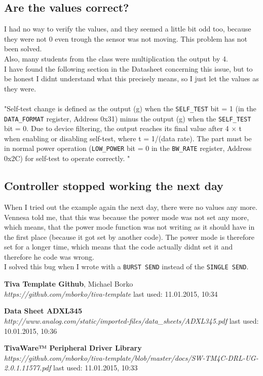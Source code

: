 \documentclass[12pt]{article}
\begin{document}
\subsection{Are the values correct?}
I had no way to verify the values, and they seemed a little bit odd too, because they were not 0 even trough the sensor was not moving. This problem has not been solved. \\
Also, many students from the class were multiplication the output by 4. \\
I have found the following section in the Datasheet concerning this issue, but to be honest I didnt understand what this precisely means, so I just let the values as they were. \\ \\
"Self-test change is defined as the output (g) when the \texttt{SELF\_TEST} bit = 1 (in the \texttt{DATA\_FORMAT} register, Address 0x31) minus the output (g) when the \texttt{SELF\_TEST} bit = 0. Due to device filtering, the output reaches its final value after 4 × t when enabling or disabling self-test, where t = 1/(data rate). The part must be in normal power operation (\texttt{LOW\_POWER} bit = 0 in the \texttt{BW\_RATE} register, Address 0x2C) for self-test to operate correctly. 
"\cite[page 5]{datasheetADXL}
\subsection{Controller stopped working the next day}
When I tried out the example again the next day, there were no values any more. 
Vennesa told me, that this was because the power mode was not set any more, which means, that the power mode function was not writing as it should have in the first place (because it got set by another code).
The power mode is therefore set for a longer time, which means that the code actually didnt set it and therefore he code was wrong. \\
I solved this bug when I wrote with a \texttt{BURST SEND} instead of the \texttt{SINGLE SEND}.

\begin{thebibliography}{56}
  \textbf{Tiva Template Github}, Michael Borko \\
  \textit{https://github.com/mborko/tiva-template}
  \newline last used: 11.01.2015, 10:34  
  
  \textbf{Data Sheet ADXL345} \\
  \textit{http://www.analog.com/static/imported-files/data\_sheets/ADXL345.pdf}
  \newline last used: 10.01.2015, 10:36
  
  \textbf{TivaWare™ Peripheral Driver Library} \\
  \textit{https://github.com/mborko/tiva-template/blob/master/docs/SW-TM4C-DRL-UG-2.0.1.11577.pdf}
  \newline last used: 11.01.2015, 10:33
  
 
  
  
\end{thebibliography}
\end{document}
